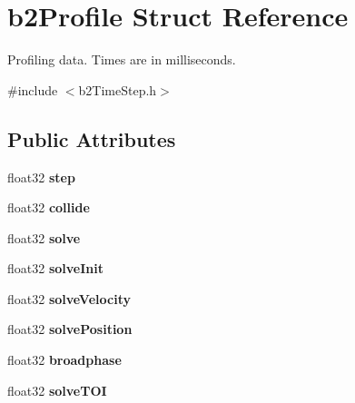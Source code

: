 \hypertarget{structb2_profile}{}\section{b2\+Profile Struct Reference}
\label{structb2_profile}


Profiling data. Times are in milliseconds.  




{\ttfamily \#include $<$b2\+Time\+Step.\+h$>$}

\subsection*{Public Attributes}
\begin{DoxyCompactItemize}
\item 
float32 {\bfseries step}\hypertarget{structb2_profile_a5b93de1d56902224868beacc478b9863}{}\label{structb2_profile_a5b93de1d56902224868beacc478b9863}

\item 
float32 {\bfseries collide}\hypertarget{structb2_profile_af827d9e54f7a4e94d0a023e18466b960}{}\label{structb2_profile_af827d9e54f7a4e94d0a023e18466b960}

\item 
float32 {\bfseries solve}\hypertarget{structb2_profile_afbefc05f05ec8bfd6cb2011929688a0b}{}\label{structb2_profile_afbefc05f05ec8bfd6cb2011929688a0b}

\item 
float32 {\bfseries solve\+Init}\hypertarget{structb2_profile_a010110900c27ccc88cd5e23b0e12e96e}{}\label{structb2_profile_a010110900c27ccc88cd5e23b0e12e96e}

\item 
float32 {\bfseries solve\+Velocity}\hypertarget{structb2_profile_ae4d29a19b38de81621bccdbf75595233}{}\label{structb2_profile_ae4d29a19b38de81621bccdbf75595233}

\item 
float32 {\bfseries solve\+Position}\hypertarget{structb2_profile_a78e22d104226863492ebab9ea30a9ed9}{}\label{structb2_profile_a78e22d104226863492ebab9ea30a9ed9}

\item 
float32 {\bfseries broadphase}\hypertarget{structb2_profile_a6bd556e43a6fa3853adad9fd71e56b44}{}\label{structb2_profile_a6bd556e43a6fa3853adad9fd71e56b44}

\item 
float32 {\bfseries solve\+T\+OI}\hypertarget{structb2_profile_a74e8ea0c6ca39250d639ec94b69a803e}{}\label{structb2_profile_a74e8ea0c6ca39250d639ec94b69a803e}

\end{DoxyCompactItemize}


